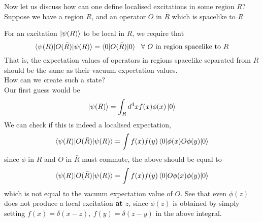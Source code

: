 \documentclass[11pt, notitlepage]{report}
\numberwithin{equation}{section}
\begin{document}
    Now let us discuss how can one define localised excitations in some region \(R\)?\\
    Suppose we have a region \(R\), and an operator \(O\) in \(\bar{R}\) which is spacelike to \(R\)
    \begin{figure}[h]
        \centering 
    \end{figure}

    For an excitation \(\ket{\psi(R)}\) to be local in \(R\), we require that 
    \begin{equation*}
        \braket{\psi(R)|O(\bar{R}) | \psi(R)} = \braket{0|O(\bar{R})|0} ~~\forall~O \text{ in region spacelike to }R
    \end{equation*} 
    That is, the expectation values of operators in regions spacelike separated from \(R\) should be the same as their vacuum expectation values.  \\

    How can we create such a state?\\
    Our first guess would be 
    \begin{equation*}
        \ket{\psi(R)} = \int_R d^4x f(x) \phi(x) \ket{0} 
    \end{equation*}
    We can check if this is indeed a localised expectation, 
    \begin{equation*}
        \braket{\psi(R)|O(\bar{R})|\psi(R)} = \int f(x) f(y) \braket{0|\phi(x) O \phi(y) | 0}
    \end{equation*}
    since \(\phi\) in \(R\) and \(O\) in \(\bar{R}\) must commute, the above should be equal to 
    \begin{equation*}
        \braket{\psi(R)|O(\bar{R})|\psi(R)} = \int f(x) f(y) \braket{0|O\phi(x)  \phi(y) | 0}
    \end{equation*}
    which is not equal to the vacuum expectation value of \(O\). See that even \(\phi(z)\) does not produce a local excitation \textbf{at \(z\)}, since \(\phi(z)\) is obtained by simply setting \(f(x) = \delta(x-z), ~f(y) = \delta(z-y)\) in the above integral.  \\
\end{document}
